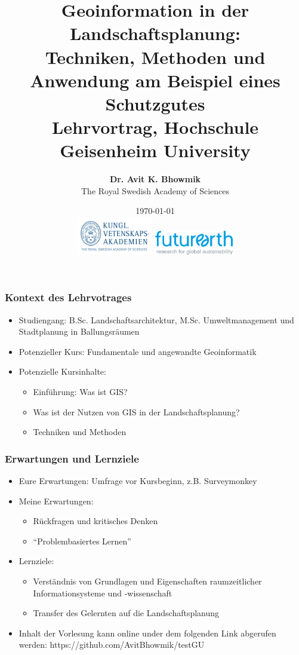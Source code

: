\documentclass{beamer}
\title[Lehrvortrag. Geoinformation in der Landschaftsplanung. 2018]{Geoinformation in der Landschaftsplanung:\\Techniken, Methoden und Anwendung am Beispiel eines Schutzgutes\\
\medskip \tiny{Lehrvortrag, Hochschule Geisenheim University}} %
\author[Avit Bhowmik]{\textbf{Dr. Avit K. Bhowmik} \\
The Royal Swedish Academy of Sciences} %
\institute[The Royal Swedish Academy of Sciences] %
{
\textit{avit.bhowmik@futureearth.org}%
}
\date[\today]{\today \\[0.2cm]
\includegraphics[width=0.25\textwidth]{Figures/KVA_logo.png}
\includegraphics[width=0.26\textwidth]{Figures/FE_logo.png}} %
\begin{document}
\begin{frame}
\titlepage %
\end{frame}


\begin{frame}
  \frametitle{Kontext des Lehrvotrages}
\begin{itemize}
\item Studiengang: B.Sc. Landschaftsarchitektur, M.Sc. Umweltmanagement und Stadtplanung in Ballungsräumen
\item Potenzieller Kurs: Fundamentale und angewandte Geoinformatik
\item \alert{Potenzielle Kursinhalte}:
\begin{itemize}
\item Einführung: Was ist GIS?
\item Was ist der Nutzen von GIS in der Landschaftsplanung? 
\item Techniken und Methoden
\end{itemize}
\end{itemize}
\end{frame}

\begin{frame}
  \frametitle{Erwartungen und Lernziele}
\begin{itemize}
\item \alert{Eure Erwartungen:} Umfrage vor Kursbeginn, z.B. Surveymonkey
\item \alert{Meine Erwartungen:}
\begin{itemize}
\item Rückfragen und kritisches Denken
\item “Problembasiertes Lernen”
\end{itemize}
\item \alert{Lernziele:}
\begin{itemize}
\item Verständnis von Grundlagen und Eigenschaften raumzeitlicher Informationsysteme und -wissenschaft
\item Transfer des Gelernten auf die Landschaftsplanung
\end{itemize}
\item Inhalt der Vorlesung kann online under dem folgenden Link abgerufen werden: \alert{https://github.com/AvitBhowmik/testGU}
\end{itemize}
\end{frame}
\end{document}
